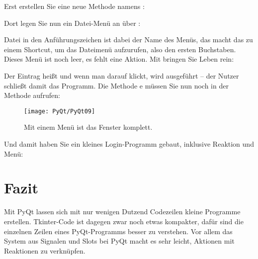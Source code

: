 Erst erstellen Sie eine neue Methode namens :
    
\medskip
    

\medskip    

Dort legen Sie nun ein Datei-Menü an über :

\medskip
    
    
\medskip
    
Datei in den Anführungszeichen ist dabei der Name des Menüs, das \PYTHON{\&} macht das  zu einem Shortcut, um das Dateimenü aufzurufen, also den ersten Buchstaben. Dieses Menü ist noch leer, es fehlt eine Aktion. Mit  bringen Sie Leben rein:

\medskip
    

\medskip
    
Der Eintrag heißt  und wenn man darauf klickt, wird  ausgeführt -- der Nutzer schließt damit das Programm. Die Methode e müssen Sie nun noch in der Methode  aufrufen:

\medskip
    

\medskip

\begin{figure}
    \texttt{[image: PyQt/PyQt09]}    
    \caption{Mit einem Menü ist das Fenster komplett.}\label{PyQt09}
\end{figure}    
    
    
    Und damit haben Sie ein kleines Login-Programm gebaut, inklusive Reaktion und Menü:
 
\begin{code}
          
  \caption{Komplettes Programm mit Menu}
\end{code}

  
\section{Fazit}

Mit PyQt lassen sich mit nur wenigen Dutzend Codezeilen kleine Programme erstellen. Tkinter-Code ist dagegen zwar noch etwas kompakter, dafür sind die einzelnen Zeilen eines PyQt-Programms besser zu verstehen. Vor allem das System aus Signalen und Slots bei PyQt macht es sehr leicht, Aktionen mit Reaktionen zu verknüpfen.
    
